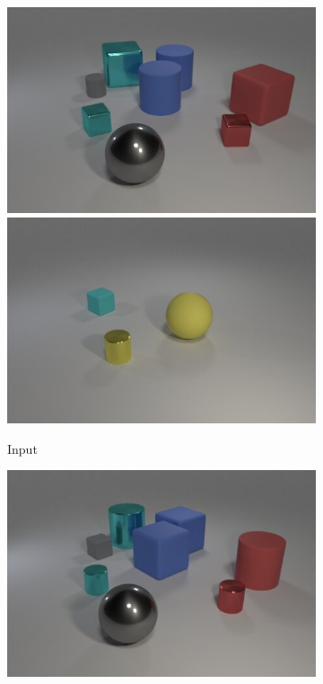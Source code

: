 \begin{figure}[t]
\centering
\begin{subfigure}{.32915\linewidth}
\centering
\includegraphics[width=\linewidth]{figures/clevr/input/0.jpg}\\
\includegraphics[width=\linewidth]{figures/clevr/input/1.jpg}
\caption{Input}
\end{subfigure}
\hfill
\begin{subfigure}{.32915\linewidth}
\centering
\includegraphics[width=\linewidth]{figures/clevr/ns-vqa/0.jpg}\\

\end{subfigure}
\end{figure}
